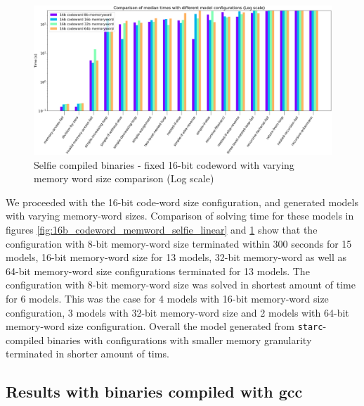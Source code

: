 \documentclass[12pt]{article}
\begin{document}
\begin{figure}[!h]
    \includegraphics[width=\linewidth]{assets/benches/16b_codeword_memword_selfie_log.png}
    \centering
    \caption{
        Selfie compiled binaries - fixed 16-bit codeword with varying memory word size comparison (Log scale)
    }
    \label{fig:16b_codeword_memword_selfie_log}
\end{figure}

We proceeded with the 16-bit code-word size configuration, and generated models
with varying memory-word sizes. Comparison of solving time for these models in
figures \ref{fig:16b_codeword_memword_selfie_linear} and
\ref{fig:16b_codeword_memword_selfie_log} show that the configuration with
8-bit memory-word size terminated within 300 seconds for 15 models, 16-bit
memory-word size for 13 models, 32-bit memory-word as well as 64-bit
memory-word size configurations terminated for 13 models. The configuration
with 8-bit memory-word size was solved in shortest amount of time for 6 models.
This was the case for 4 models with 16-bit memory-word size configuration, 3
models with 32-bit memory-word size and 2 models with 64-bit memory-word size
configuration. Overall the model generated from \texttt{starc}-compiled
binaries with configurations with smaller memory granularity terminated in
shorter amount of tims.

\subsection{Results with binaries compiled with gcc}
\end{document}
